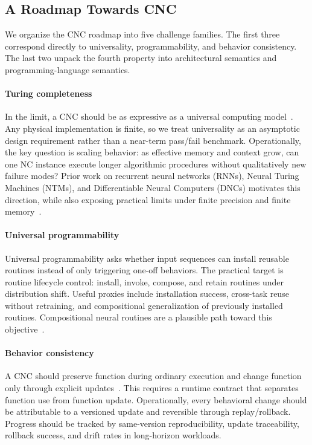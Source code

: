 \subsection{A Roadmap Towards CNC}
\label{sec:roadmap}
We organize the CNC roadmap into five challenge families.
The first three correspond directly to universality, programmability, and behavior consistency.
The last two unpack the fourth property into architectural semantics and programming-language semantics.

\paragraph{Turing completeness}
In the limit, a CNC should be as expressive as a universal computing model~\citep{turing1936computable,siegelmann1992computational}.
Any physical implementation is finite, so we treat universality as an asymptotic design requirement rather than a near-term pass/fail benchmark.
Operationally, the key question is scaling behavior: as effective memory and context grow, can one NC instance execute longer algorithmic procedures without qualitatively new failure modes?
Prior work on recurrent neural networks (RNNs), Neural Turing Machines (NTMs), and Differentiable Neural Computers (DNCs) motivates this direction, while also exposing practical limits under finite precision and finite memory~\citep{graves2014neural,graves2016hybrid,perez2021attention,rusu2016progressive,vaswani2017attention}.

\paragraph{Universal programmability}
Universal programmability asks whether input sequences can install reusable routines instead of only triggering one-off behaviors.
The practical target is routine lifecycle control: install, invoke, compose, and retain routines under distribution shift.
Useful proxies include installation success, cross-task reuse without retraining, and compositional generalization of previously installed routines.
Compositional neural routines are a plausible path toward this objective~\citep{reed2015neural}.

\paragraph{Behavior consistency}
A CNC should preserve function during ordinary execution and change function only through explicit updates~\citep{queloz2025explainability}.
This requires a runtime contract that separates function use from function update.
Operationally, every behavioral change should be attributable to a versioned update and reversible through replay/rollback.
Progress should be tracked by same-version reproducibility, update traceability, rollback success, and drift rates in long-horizon workloads.

